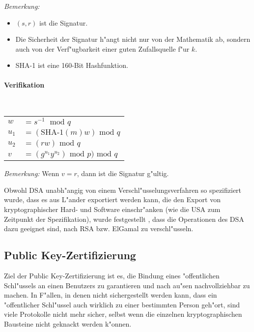 \emph{Bemerkung:}
\begin{itemize}
\item $(s,r)$ ist die Signatur.
\item Die Sicherheit der Signatur h"angt nicht nur von der Mathematik ab,
sondern auch von der Verf"ugbarkeit einer guten Zufallsquelle
f"ur $k$.
\item SHA-1  ist eine 160-Bit Hashfunktion.

\end{itemize}
\paragraph{Verifikation}\strut\\
\begin{tabular}{l@{ }l}
$w$ & $= s^{-1} \;  \mbox{ mod } q$\\
$u_1$ & $= (\mbox{SHA-1}(m)w) \mbox{ mod } q$\\
$u_2$ & $= (rw)  \mbox{ mod } q$\\
$v$ & $= (g^{u_1}y^{u_2}) \mbox{ mod } p)  \mbox{ mod } q$\\

\end{tabular}

\emph{Bemerkung:} Wenn $v = r$, dann ist die Signatur g"ultig.

Obwohl DSA unabh"angig von einem Verschl"usselungsverfahren so spezifiziert
wurde, dass es aus L"ander exportiert werden kann, die den Export von
kryptographischer Hard- und Software einschr"anken (wie die USA zum
Zeitpunkt der Spezifikation), wurde festgestellt
\cite[S.~490]{5Schneier1996ds}, dass die Operationen des DSA dazu geeignet
sind, nach RSA bzw. ElGamal zu verschl"usseln.



\subsection{Public Key-Zertifizierung}
Ziel der Public Key-Zertifizierung ist es, die Bindung eines 
"offentlichen Schl"ussels an einen Benutzers zu garantieren und nach au"sen
nachvollziehbar zu machen. In F"allen, in denen nicht sichergestellt werden
kann, dass ein "offentlicher Schl"ussel auch wirklich zu einer bestimmten
Person geh"ort, sind viele Protokolle nicht mehr sicher, selbst wenn die
einzelnen kryptographischen Bausteine nicht geknackt werden k"onnen.



